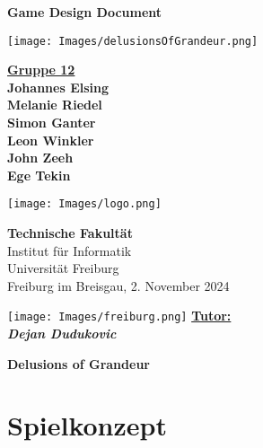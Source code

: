 \documentclass[11pt]{article}
\begin{document}
\begin{titlepage}
\centering
\vspace*{0.5cm}
{\huge \textbf{Game Design Document}}

\vspace{1cm}
\texttt{[image: Images/delusionsOfGrandeur.png]}

\vspace{0.8cm}
{\Large \textbf {\underline {Gruppe 12}} \\}
\vspace{0.5cm}
{\Large \textbf {Johannes Elsing} \\}
{\Large \textbf{Melanie Riedel} \\}
{\Large \textbf{Simon Ganter} \\}
{\Large \textbf{Leon Winkler} \\}
{\Large \textbf{John Zeeh}\\}
{\Large \textbf{Ege Tekin}\\}

\vspace{1cm}

\begin{flushleft}
    \begin{minipage}{0.3\textwidth}
        \texttt{[image: Images/logo.png]}
    \end{minipage}
    \hfill
    \begin{adjustwidth}
    \begin{minipage}{0.6\textwidth}
        \textbf{Technische Fakultät} \\
        Institut für Informatik \\
        Universität Freiburg \\
        Freiburg im Breisgau, 2. November 2024
    \end{minipage}
    \end{adjustwidth}
\end{flushleft}
\texttt{[image: Images/freiburg.png]}
\vfill
{\Large \textbf {\underline {Tutor:}} \\}
{\Large \textbf{\textit{Dejan Dudukovic}} \\}

\vspace{0.8cm}


\end{titlepage}
\tableofcontents \textbf {Delusions of Grandeur}
\newpage
\section{Spielkonzept}
\end{document}
